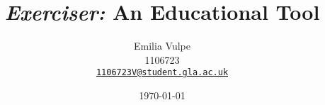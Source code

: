 \documentclass{template}
\title{\bf \emph{Exerciser:} An Educational Tool}
\author{Emilia Vulpe\\1106723\\\href{mailto:1106723V@student.gla.ac.uk}{\texttt{1106723V@student.gla.ac.uk}}}
\date{\today}
\begin{document}
	\maketitle
	
	
	\educationalconsent
	\onehalfspacing
	
	\tableofcontents
	
	
	
	
	
	
	
	
	
\end{document}
